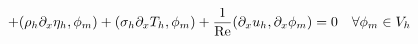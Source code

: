 \documentclass[preview]{standalone}
\newcommand{\dx}{\partial_x}
\begin{document}
\begin{align*}
\special{dvisvgm:raw <g id='unique000'>}\qquad+(\rho_h\dx\eta_h,\phi_m)+(\sigma_h\dx T_h,\phi_m)+\frac{1}{\mathrm{Re}}(\dx u_h,\dx\phi_m)=0\quad\forall\phi_m\in V_h\special{dvisvgm:raw </g>}
\end{align*}
\end{document}
